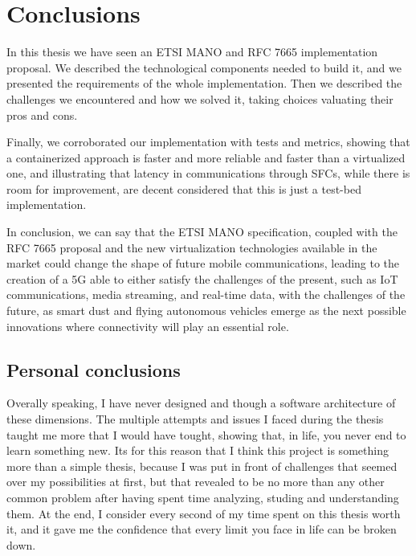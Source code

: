 \chapter{Conclusions}
\label{chap:conclusions}

In this thesis we have seen an ETSI MANO and RFC 7665 implementation proposal. 
We described the technological components needed to build it, and we presented 
the requirements of the whole implementation. Then we described the challenges 
we encountered and how we solved it, taking choices valuating their pros and 
cons.

Finally, we corroborated our implementation with tests and metrics, showing 
that a containerized approach is faster and more reliable and faster than a 
virtualized one, and illustrating that latency in communications through SFCs, 
while there is room for improvement, are decent considered that this is just 
a test-bed implementation.

In conclusion, we can say that the ETSI MANO specification, coupled with the 
RFC 7665 proposal and the new virtualization technologies available in the 
market could change the shape of future mobile communications, leading to the 
creation of a 5G able to either satisfy the challenges of the present, such as 
IoT communications, media streaming, and real-time data, with the challenges of 
the future, as smart dust and flying autonomous vehicles emerge as the next 
possible innovations where connectivity will play an essential role.

\section*{Personal conclusions}

Overally speaking, I have never designed and though a software architecture of
these dimensions. The multiple attempts and issues I faced during the thesis
taught me more that I would have tought, showing that, in life, you never end to
learn something new. Its for this reason that I think this project is something
more than a simple thesis, because I was put in front of challenges that seemed
over my possibilities at first, but that revealed to be no more than any other
common problem after having spent time analyzing, studing and understanding
them. At the end, I consider every second of my time spent on this thesis worth
it, and it gave me the confidence that every limit you face in life can be
broken down.
